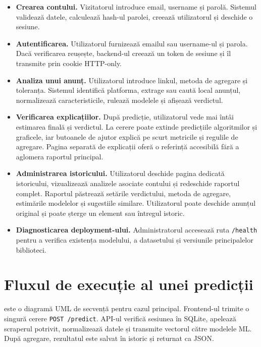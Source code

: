 \begin{itemize}
    \item \textbf{Crearea contului.} Vizitatorul introduce email, username și parolă. Sistemul validează datele, calculează hash-ul parolei, creează utilizatorul și deschide o sesiune.
    \item \textbf{Autentificarea.} Utilizatorul furnizează emailul sau username-ul și parola. Dacă verificarea reușește, backend-ul creează un token de sesiune și îl transmite prin cookie HTTP-only.
    \item \textbf{Analiza unui anunț.} Utilizatorul introduce linkul, metoda de agregare și toleranța. Sistemul identifică platforma, extrage sau caută local anunțul, normalizează caracteristicile, rulează modelele și afișează verdictul.
    \item \textbf{Verificarea explicațiilor.} După predicție, utilizatorul vede mai întâi estimarea finală și verdictul. La cerere poate extinde predicțiile algoritmilor și graficele, iar butoanele de ajutor explică pe scurt metricile și regulile de agregare. Pagina separată de explicații oferă o referință accesibilă fără a aglomera raportul principal.
    \item \textbf{Administrarea istoricului.} Utilizatorul deschide pagina dedicată istoricului, vizualizează analizele asociate contului și redeschide raportul complet. Raportul păstrează setările verdictului, metoda de agregare, estimările modelelor și sugestiile similare. Utilizatorul poate deschide anunțul original și poate șterge un element sau întregul istoric.
    \item \textbf{Diagnosticarea deployment-ului.} Administratorul accesează ruta \texttt{/health} pentru a verifica existența modelului, a datasetului și versiunile principalelor biblioteci.
\end{itemize}

\section{Fluxul de execuție al unei predicții}
\label{sec:app-predict-flow}

 este o diagramă UML de secvență pentru cazul principal. Frontend-ul trimite o singură cerere \texttt{POST /predict}. API-ul verifică sesiunea în SQLite, apelează scraperul potrivit, normalizează datele și transmite vectorul către modelele ML. După agregare, rezultatul este salvat în istoric și returnat ca JSON.

